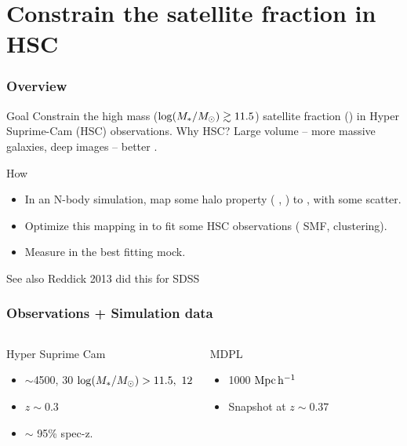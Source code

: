 \documentclass[t]{beamer}
\begin{document}
\begin{frame}
    \frametitle{}
    \tableofcontents
\end{frame}


\section{Constrain the satellite fraction in HSC}
\begin{frame}
    \frametitle{Overview}
    \begin{block}{Goal}
        Constrain the high mass (${\rm log}{}(M_{\ast}{} / \mbox{$M_{\odot}$}{}){} \gtrsim{} 11.5$) satellite fraction (\fsat{}) in Hyper Suprime-Cam (HSC) observations. Why HSC? Large volume -- more massive galaxies, deep images -- better \Mstar{}.
    \end{block}

    \begin{block}{How}
        \begin{itemize}
            \item In an N-body simulation, map some halo property (\eg{} \MhaloPeak{}, \vmp{}) to \Mstar{}, with some scatter.
            \item Optimize this mapping in to fit some HSC observations (\eg{} SMF, clustering).
            \item Measure \fsat{} in the best fitting mock.
        \end{itemize}
    \end{block}

    \begin{block}{See also}
        Reddick 2013 did this for SDSS
    \end{block}
\end{frame}

\begin{frame}
    \frametitle{Observations + Simulation data}

    \begin{columns}

    \begin{block}{Hyper Suprime Cam}
        \begin{itemize}
            \item $\sim{}$4500, 30 ${\rm log}{}(M_{\ast}{} / \mbox{$M_{\odot}$}{}) > 11.5,\ 12$
            \item $z \sim{} 0.3$
            \item $\sim$ 95\% spec-z.
        \end{itemize}
    \end{block}

    \begin{block}{MDPL}
        \begin{itemize}
            \item 1000 ${\rm Mpc}{}\, {\rm h^{-1}}{}$
            \item Snapshot at $z \sim{} 0.37$
        \end{itemize}
    \end{block}

    \end{columns}

\end{frame}
\end{document}
